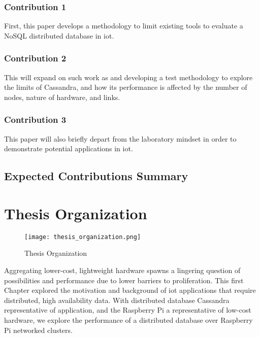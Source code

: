 \subsubsection{Contribution 1}
First, this paper develops a methodology to limit existing tools \cite{YahooBenchmark} to evaluate a NoSQL distributed database in \gls{iot}.
\subsubsection{Contribution 2}
This will expand on such work as \cite{Abramova2014TestingCassandra} and \cite{YahooBenchmark} developing a test methodology to explore the limits of Cassandra, and how its performance is affected by the number of nodes, nature of hardware, and links.
\subsubsection{Contribution 3}
This paper will also briefly depart from the laboratory mindset in order to demonstrate potential applications in \gls{iot}.
\subsection{Expected Contributions Summary}


\section{Thesis Organization}

\begin{figure}[h]
\texttt{[image: thesis\_organization.png]}

\caption{Thesis Organization}

\label{fig:res}
\end{figure}

	Aggregating lower-cost, lightweight hardware spawns a lingering question of possibilities and performance due to lower barriers to proliferation.  This first Chapter explored the motivation and background of \gls{iot} applications that require distributed, high availability data. With distributed database Cassandra representative of application, and the Raspberry Pi a representative of low-cost hardware, we explore the performance of a distributed database over Raspberry Pi networked clusters. 


